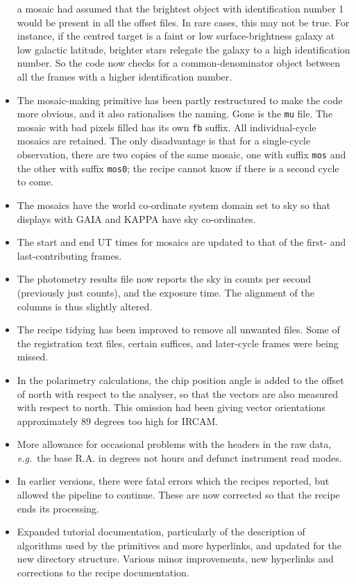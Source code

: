 \documentclass[twoside,11pt]{article}
\newcommand{\xref}[3]{#1}
\renewcommand{\_}{\texttt{\symbol{95}}}
\newcommand{\GAIA}{{\footnotesize GAIA}}
\newcommand{\KAPPA}{{\footnotesize KAPPA}}
\begin{document}
\begin{itemize}
         a mosaic had assumed that the brightest object with
         identification number 1 would be present in all the offset
	 files.  In rare cases, this may not be true.  For instance,
	 if the centred target is a faint or low surface-brightness
	 galaxy at low galactic latitude, brighter stars relegate the
	 galaxy to a high identification number.  So the code now
	 checks for a common-denominator object between all the frames
	 with a higher identification number. 
   \item The mosaic-making primitive has been partly restructured to
         make the code more obvious, and it also rationalises the
         naming.  Gone is the {\tt\_mu} file.  The mosaic with bad
	 pixels filled has its own {\tt\_fb} suffix.  All
	 individual-cycle mosaics are retained.  The only disadvantage
	 is that for a single-cycle observation, there are two copies
	 of the same mosaic, one with suffix {\tt\_mos} and the other
	 with suffix {\tt\_mos\_0}; the recipe cannot know if there
         is a second cycle to come.
   \item The mosaics have the world co-ordinate system domain set to sky
         so that displays with \xref{\GAIA}{sun214}{} and 
         \xref{\KAPPA}{sun95}{} have sky co-ordinates.
   \item The start and end UT times for mosaics are updated to that of
         the first- and last-contributing frames.
   \item The photometry results file now reports the sky in counts per
         second (previously just counts), and the exposure time.  The
         alignment of the columns is thus slightly altered.
   \item The recipe tidying has been improved to remove all unwanted
         files.  Some of the registration text files, certain suffices,
         and later-cycle frames were being missed.
   \item In the polarimetry calculations, the chip position angle is
         added to the offset of north with respect to the analyser,
         so that the vectors are also measured with respect to north. 
         This omission had been giving vector orientations approximately
         89 degrees too high for IRCAM.
   \item More allowance for occasional problems with the headers in the
         raw data, {\em e.g.}\ the base R.A. in degrees not hours and
         defunct instrument read modes.
   \item In earlier versions, there were fatal errors which the recipes
         reported, but allowed the pipeline to continue.  These are now
         corrected so that the recipe ends its processing.
   \item Expanded tutorial documentation, particularly of the description
         of algorithms used by the primitives and more hyperlinks, and
         updated for the new directory structure.  Various minor
         improvements, new hyperlinks and corrections to the recipe
         documentation.
\end{itemize}
\end{document}

